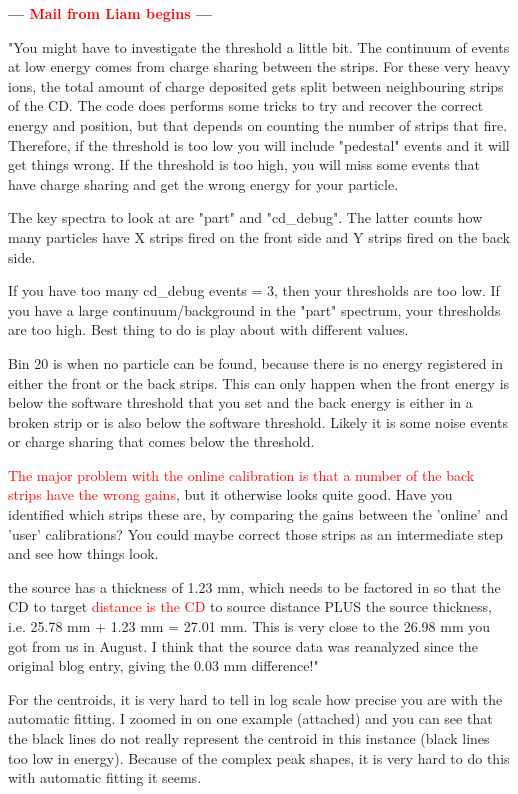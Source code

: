 \documentclass[twoside,english]{uiofysmaster/uiofysmaster}
\begin{document}
\textbf{--- \textcolor{red}{Mail from Liam begins} ---}

"You might have to investigate the threshold a little bit. The continuum of events at low energy comes from charge sharing between the strips. For these very heavy ions, the total amount of charge deposited gets split between neighbouring strips of the CD. The code does performs some tricks to try and recover the correct energy and position, but that depends on counting the number of strips that fire. Therefore, if the threshold is too low you will include "pedestal" events and it will get things wrong. If the threshold is too high, you will miss some events that have charge sharing and get the wrong energy for your particle. 

The key spectra to look at are "part" and "cd\_debug". The latter counts how many particles have X strips fired on the front side and Y strips fired on the back side.

If you have too many cd\_debug events = 3, then your thresholds are too low. If you have a large continuum/background in the "part" spectrum, your thresholds are too high. Best thing to do is play about with different values.

Bin 20 is when no particle can be found, because there is no energy registered in either the front or the back strips. This can only happen when the front energy is below the software threshold that you set and the back energy is either in a broken strip or is also below the software threshold. Likely it is some noise events or charge sharing that comes below the threshold.

\textcolor{red}{The major problem with the online calibration is that a number of the back strips have the wrong gains}, but it otherwise looks quite good. Have you identified which strips these are, by comparing the gains between the 'online' and 'user' calibrations? You could maybe correct those strips as an intermediate step and see how things look.

the source has a thickness of 1.23 mm, which needs to be factored in so that the CD to target \textcolor{red}{distance is the CD} to source distance PLUS the source thickness, i.e. 25.78 mm + 1.23 mm =  27.01 mm. This is very close to the 26.98 mm you got from us in August. I think that the source data was reanalyzed since the original blog entry, giving the 0.03 mm difference!"

For the centroids, it is very hard to tell in log scale how precise you are with the automatic fitting. I zoomed in on one example (attached) and you can see that the black lines do not really represent the centroid in this instance (black lines too low in energy). Because of the complex peak shapes, it is very hard to do this with automatic fitting it seems. 
\end{document}
